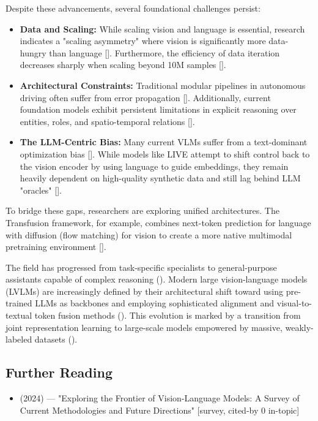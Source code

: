 \documentclass[11pt]{article}
\begin{document}
Despite these advancements, several foundational challenges persist:
\begin{itemize}
  \item \textbf{Data and Scaling:} While scaling vision and language is essential, research indicates a "scaling asymmetry" where vision is significantly more data-hungry than language [\citep{2603.03276}]. Furthermore, the efficiency of data iteration decreases sharply when scaling beyond 10M samples [\citep{2501.14818}].
  \item \textbf{Architectural Constraints:} Traditional modular pipelines in autonomous driving often suffer from error propagation [\citep{2512.16760}]. Additionally, current foundation models exhibit persistent limitations in explicit reasoning over entities, roles, and spatio-temporal relations [\citep{2508.18421}].
  \item \textbf{The LLM-Centric Bias:} Many current VLMs suffer from a text-dominant optimization bias [\citep{2601.19798}]. While models like LIVE attempt to shift control back to the vision encoder by using language to guide embeddings, they remain heavily dependent on high-quality synthetic data and still lag behind LLM "oracles" [\citep{2606.19584}].
\end{itemize}

To bridge these gaps, researchers are exploring unified architectures. The Transfusion framework, for example, combines next-token prediction for language with diffusion (flow matching) for vision to create a more native multimodal pretraining environment [\citep{2603.03276}].

The field has progressed from task-specific specialists to general-purpose assistants capable of complex reasoning (\citep{2309.10020}). Modern large vision-language models (LVLMs) are increasingly defined by their architectural shift toward using pre-trained LLMs as backbones and employing sophisticated alignment and visual-to-textual token fusion methods (\citep{2501.02189}). This evolution is marked by a transition from joint representation learning to large-scale models empowered by massive, weakly-labeled datasets (\citep{2203.01922}).

\subsection{Further Reading}

\begin{itemize}
  \item \citep{2404.07214} (2024) — "Exploring the Frontier of Vision-Language Models: A Survey of Current Methodologies and Future Directions" [survey, cited-by 0 in-topic]
\end{itemize}
\end{document}

